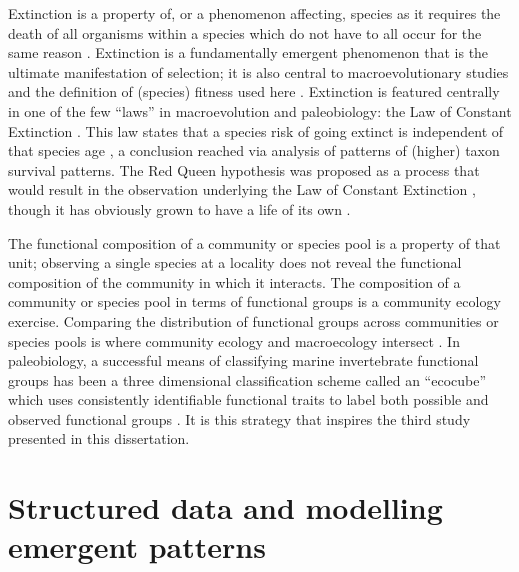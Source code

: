 Extinction is a property of, or a phenomenon affecting, species as it requires the death of all organisms within a species which do not have to all occur for the same reason \citep{Simpson2016a}. Extinction is a fundamentally emergent phenomenon that is the ultimate manifestation of selection; it is also central to macroevolutionary studies and the definition of (species) fitness used here \citep{Cooper1984}. Extinction is featured centrally in one of the few ``laws'' in macroevolution and paleobiology: the Law of Constant Extinction \citep{VanValen1973,Liow2011a}. This law states that a species risk of going extinct is independent of that species age \citep{VanValen1973,Liow2011a}, a conclusion reached via analysis of patterns of (higher) taxon survival patterns. The Red Queen hypothesis was proposed as a process that would result in the observation underlying the Law of Constant Extinction \citep{VanValen1973}, though it has obviously grown to have a life of its own \citep{Liow2011a}.

The functional composition of a community or species pool is a property of that unit; observing a single species at a locality does not reveal the functional composition of the community in which it interacts. The composition of a community or species pool in terms of functional groups is a community ecology exercise. Comparing the distribution of functional groups across communities or species pools is where community ecology and macroecology intersect \citep{Mcgill2006,Brown1995,Smith2008b}. In paleobiology, a successful means of classifying marine invertebrate functional groups has been a three dimensional classification scheme called an ``ecocube'' which uses consistently identifiable functional traits to label both possible and observed functional groups \citep{Bush2007,Bambach2007}. It is this strategy that inspires the third study presented in this dissertation.



\section{Structured data and modelling emergent patterns}



